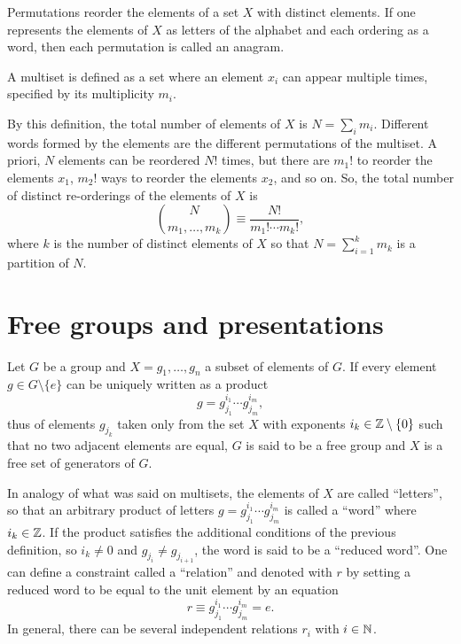 Permutations reorder the elements of a set $X$ with distinct elements. If one represents the elements of $X$ as letters of the alphabet and each ordering as a word, then each permutation is called an anagram. 
\begin{defn}[multiset]
    A multiset is defined as a set where an element $x_i$ can appear multiple times, specified by its multiplicity $m_i$.
\end{defn}
By this definition, the total number of elements of $X$ is $N = \sum_i m_i$. Different words formed by the elements are the different permutations of the multiset. A priori, $N$ elements can be reordered $N!$ times, but there are $m_1!$ to reorder the elements $x_1$, $m_2!$ ways to reorder the elements $x_2$, and so on. So, the total number of distinct re-orderings of the elements of $X$ is 
\begin{equation}
    \binom{N}{m_1,\dots,m_k} \equiv \frac{N!}{m_1!\cdots m_k!},
\end{equation}
where $k$ is the number of distinct elements of $X$ so that $N = \sum_{i=1}^k m_k$ is a partition of $N$. 

\section{Free groups and presentations}
\begin{defn}
    Let $G$ be a group and $X = {g_1,\dots,g_n}$ a subset of elements of $G$. If every element $g \in G\setminus\{e\}$ can be uniquely written as a product 
    \begin{equation}
        g = g_{j_1}^{i_1}\cdots g_{j_m}^{i_m},
    \end{equation}
    thus of elements $g_{j_k}$ taken only from the set $X$ with exponents $i_k \in \mathbb{Z} \setminus\{0\}$ such that no two adjacent elements are equal, $G$ is said to be a free group and $X$ is a free set of generators of $G$. 
\end{defn}
In analogy of what was said on multisets, the elements of $X$ are called ``letters'', so that an arbitrary product of letters $g = g_{j_1}^{i_1}\cdots g_{j_m}^{i_m}$ is called a ``word'' where $i_k \in \mathbb{Z}$. If the product satisfies the additional conditions of the previous definition, so $i_k \neq 0$ and $g_{j_i} \neq g_{j_{i+1}}$, the word is said to be a ``reduced word''. One can define a constraint called a ``relation'' and denoted with $r$ by setting a reduced word to be equal to the unit element by an equation
\begin{equation}
    r \equiv g_{j_1}^{i_1} \cdots g_{j_m}^{i_m} = e.
\end{equation}
In general, there can be several independent relations $r_i$ with $i \in \mathbb{N}$. 

